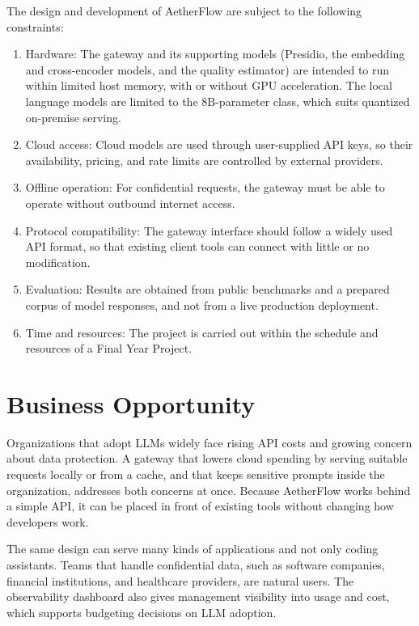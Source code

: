 The design and development of AetherFlow are subject to the following constraints:

\begin{enumerate}
    \item Hardware: The gateway and its supporting models (Presidio, the embedding and cross-encoder models, and the quality estimator) are intended to run within limited host memory, with or without GPU acceleration. The local language models are limited to the 8B-parameter class, which suits quantized on-premise serving.
    \item Cloud access: Cloud models are used through user-supplied API keys, so their availability, pricing, and rate limits are controlled by external providers.
    \item Offline operation: For confidential requests, the gateway must be able to operate without outbound internet access.
    \item Protocol compatibility: The gateway interface should follow a widely used API format, so that existing client tools can connect with little or no modification.
    \item Evaluation: Results are obtained from public benchmarks and a prepared corpus of model responses, and not from a live production deployment.
    \item Time and resources: The project is carried out within the schedule and resources of a Final Year Project.
\end{enumerate}

\section{Business Opportunity}
\label{sec:business}

Organizations that adopt LLMs widely face rising API costs and growing concern about data protection. A gateway that lowers cloud spending by serving suitable requests locally or from a cache, and that keeps sensitive prompts inside the organization, addresses both concerns at once. Because AetherFlow works behind a simple API, it can be placed in front of existing tools without changing how developers work.

The same design can serve many kinds of applications and not only coding assistants. Teams that handle confidential data, such as software companies, financial institutions, and healthcare providers, are natural users. The observability dashboard also gives management visibility into usage and cost, which supports budgeting decisions on LLM adoption.

